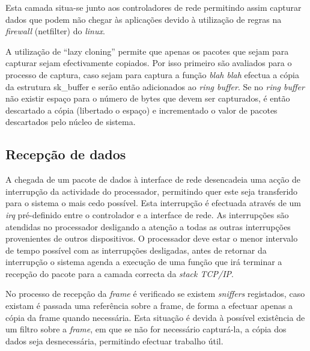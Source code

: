 Esta camada situa-se junto aos controladores de rede permitindo assim capturar dados que podem não chegar às aplicações devido à utilização de regras na \textit{firewall} (netfilter) do \textit{linux}.

A utilização de ``lazy cloning'' permite que apenas os pacotes que sejam para capturar sejam efectivamente copiados.
 Por isso primeiro são avaliados para o processo de captura, caso sejam para captura a função \textit{blah blah} efectua a cópia da estrutura sk\_buffer e serão então adicionados ao \textit{ring buffer}.
 Se no \textit{ring buffer} não existir espaço para o número de bytes que devem ser capturados, é então descartado a cópia (libertado o espaço) e incrementado o valor de pacotes descartados pelo núcleo de sistema.

\subsection{Recepção de dados}

A chegada de um pacote de dados à interface de rede desencadeia uma acção de interrupção da actividade do processador, permitindo quer este seja transferido para o sistema o mais cedo possível. Esta interrupção é efectuada através de um \textit{irq} pré-definido entre o controlador e a interface de rede. As interrupções são atendidas no processador desligando a atenção a todas as outras interrupções provenientes de outros dispositivos. %
O processador deve estar o menor intervalo de tempo possível com as interrupções desligadas, antes de retornar da interrupção o sistema agenda a execução de uma função que irá terminar a recepção do pacote para a camada correcta da \textit{stack TCP/IP}.%

No processo de recepção da \textit{frame} é verificado se existem \textit{sniffers} registados, caso existam é passada uma referência sobre a frame, de forma a efectuar apenas a cópia da frame quando necessária. Esta situação é devida à possível existência de um filtro sobre a \textit{frame}, em que se não for necessário capturá-la, a cópia dos dados seja desnecessária, permitindo efectuar trabalho útil.



